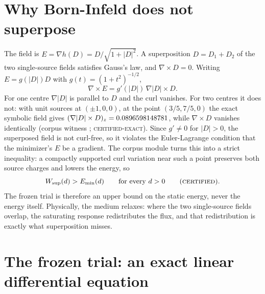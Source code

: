 \documentclass[aps,prd,onecolumn,amsmath,amssymb,longbibliography,floatfix,nofootinbib]{revtex4-2}
\newcommand{\Wsup}{W_{\mathrm{sup}}}
\newcommand{\Emin}{E_{\min}}
\newcommand{\st}[1]{\textsc{#1}}
\begin{document}
\section{Why Born-Infeld does not superpose}
\label{sec:nonsup}
The field is $E=\nabla h(D)=D/\sqrt{1+|D|^2}$. A superposition $D=D_1+D_2$ of the two single-source fields satisfies Gauss's law, and $\nabla\times D=0$. Writing $E=g(|D|)D$ with $g(t)=(1+t^2)^{-1/2}$,
\begin{equation}
\nabla\times E=g'(|D|)\,\nabla|D|\times D .
\end{equation}
For one centre $\nabla|D|$ is parallel to $D$ and the curl vanishes. For two centres it does not: with unit sources at $(\pm1,0,0)$, at the point $(3/5,7/5,0)$ the exact symbolic field gives $(\nabla|D|\times D)_z=0.0896598148781$, while $\nabla\times D$ vanishes identically (corpus witness ; \st{certified-exact}). Since $g'\neq0$ for $|D|>0$, the superposed field is not curl-free, so it violates the Euler-Lagrange condition that the minimizer's $E$ be a gradient. The corpus module  turns this into a strict inequality: a compactly supported curl variation near such a point preserves both source charges and lowers the energy, so
\begin{equation}
\Wsup(d)>\Emin(d)\qquad\text{for every } d>0 \qquad(\st{certified}).
\end{equation}
The frozen trial is therefore an upper bound on the static energy, never the energy itself. Physically, the medium relaxes: where the two single-source fields overlap, the saturating response redistributes the flux, and that redistribution is exactly what superposition misses.

\section{The frozen trial: an exact linear differential equation}
\label{sec:frozen}
\end{document}
